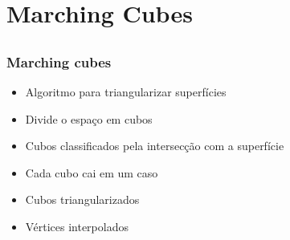 \documentclass[brazil]{beamer}
\begin{document}
  \section{Marching Cubes}
  
    \subsection{}
    
    \begin{frame}
      \frametitle{Marching cubes}
      \begin{itemize}
        \item Algoritmo para triangularizar superfícies
        \item Divide o espaço em cubos
        \item Cubos classificados pela intersecção com a superfície
        \item Cada cubo cai em um caso
        \item Cubos triangularizados
        \item Vértices interpolados
      \end{itemize}
    \end{frame}    
\end{document}
